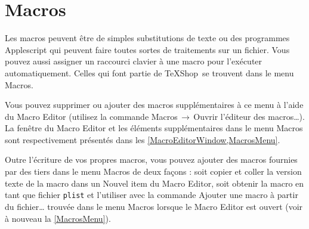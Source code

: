 \documentclass[11pt,french]{article}
\newcommand{\TS}{\textsf{\TeX Shop}}
\newcommand{\mnu}[1]{\textsf{#1}}
\newcommand{\To}{\,\(\to\)\,}
\begin{document}




\section{Macros}

Les macros peuvent être de simples substitutions de texte ou des programmes Applescript qui peuvent faire toutes sortes de traitements sur un fichier. Vous pouvez aussi assigner un raccourci clavier à une macro pour l'exécuter automatiquement. Celles qui font partie de \TS\ se trouvent dans le menu \mnu{Macros}.

Vous pouvez supprimer ou ajouter des macros supplémentaires à ce menu à l'aide du \mnu{Macro Editor} (utilisez la commande \mnu{Macros}\To\mnu{Ouvrir l'éditeur des macros…}). La fenêtre du \mnu{Macro Editor} et les éléments supplémentaires dans le menu \mnu{Macros} sont respectivement présentés dans les \vref{MacroEditorWindow,MacrosMenu}.

Outre l'écriture de vos propres macros, vous pouvez ajouter des macros fournies par des tiers dans le menu \mnu{Macros} de deux façons : soit copier et coller la version texte de la macro dans un \mnu{Nouvel item} du \mnu{Macro Editor}, soit obtenir la macro en tant que fichier \texttt{plist} et l'utiliser avec la commande \mnu{Ajouter une macro à partir du fichier…} trouvée dans le menu \mnu{Macros} lorsque le \mnu{Macro Editor} est ouvert (voir à nouveau la \cref{MacrosMenu}).
\end{document}

